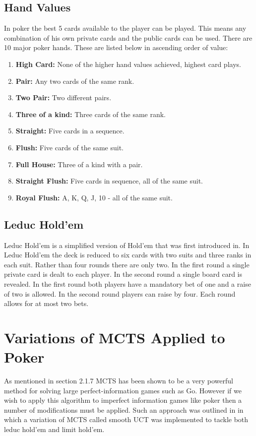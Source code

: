 \subsection{Hand Values}\label{subsec:handValues}
In poker the best 5 cards available to the player can be played.
This means any combination of his own private cards and the public cards can be used.
There are 10 major poker hands.
These are listed below in ascending order of value:
\begin{enumerate}
    \item \textbf{High Card:} None of the higher hand values achieved, highest card plays.
    \item \textbf{Pair:} Any two cards of the same rank.
    \item \textbf{Two Pair:} Two different pairs.
    \item \textbf{Three of a kind:} Three cards of the same rank.
    \item \textbf{Straight:} Five cards in a sequence.
    \item \textbf{Flush:} Five cards of the same suit.
    \item \textbf{Full House:} Three of a kind with a pair.
    \item \textbf{Straight Flush:} Five cards in sequence, all of the same suit.
    \item \textbf{Royal Flush:} A, K, Q, J, 10 - all of the same suit.
\end{enumerate}

\subsection{Leduc Hold'em}\label{subsec:leducHoldem}
Leduc Hold'em is a simplified version of Hold'em that was first introduced in\citep{southey2012bayes}.
In Leduc Hold'em the deck is reduced to six cards with two suits and three ranks in each suit.
Rather than four rounds there are only two.
In the first round a single private card is dealt to each player.
In the second round a single board card is revealed.
In the first round both players have a mandatory bet of one and a raise of two is allowed.
In the second round players can raise by four.
Each round allows for at most two bets.


\section{Variations of MCTS Applied to Poker}\label{sec:mctsPoker}
As mentioned in section 2.1.7 MCTS has been shown to be a very powerful method for solving large
perfect-information games such as Go.
However if we wish to apply this algorithm to imperfect information games like poker then 
a number of modifications must be applied.
Such an approach was outlined in\citep{heinrich2017reinforcement} in which a variation of
MCTS called smooth UCT was implemented to tackle both leduc hold'em and limit hold'em.

